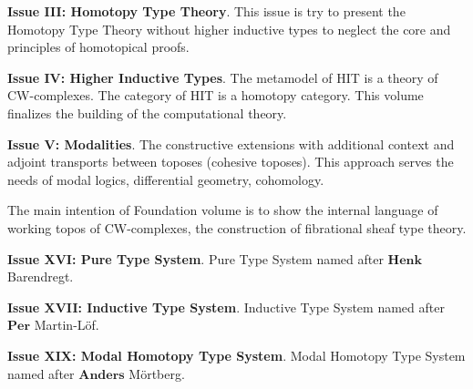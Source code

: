 \documentclass{article}
\theoremstyle{definition}
\begin{document}
{\bf Issue III: Homotopy Type Theory}.
This issue is try to present the Homotopy Type Theory without higher inductive types
to neglect the core and principles of homotopical proofs.

{\bf Issue IV: Higher Inductive Types}.
The metamodel of HIT is a theory of CW-complexes. The category of HIT is a homotopy category.
This volume finalizes the building of the computational theory.

{\bf Issue V: Modalities}. The constructive extensions with additional context and
adjoint transports between toposes (cohesive toposes). This approach serves the needs
of modal logics, differential geometry, cohomology.

The main intention of Foundation volume is to show the internal language
of working topos of CW-complexes, the construction of fibrational sheaf type theory.

{\bf Issue XVI: Pure Type System}. Pure Type System named after $\mathbf{Henk}$ Barendregt.

{\bf Issue XVII: Inductive Type System}. Inductive Type System named after $\mathbf{Per}$ Martin-L\"{o}f.

{\bf Issue XIX: Modal Homotopy Type System}. Modal Homotopy Type System named after $\mathbf{Anders}$ M\"{o}rtberg.
\end{document}
